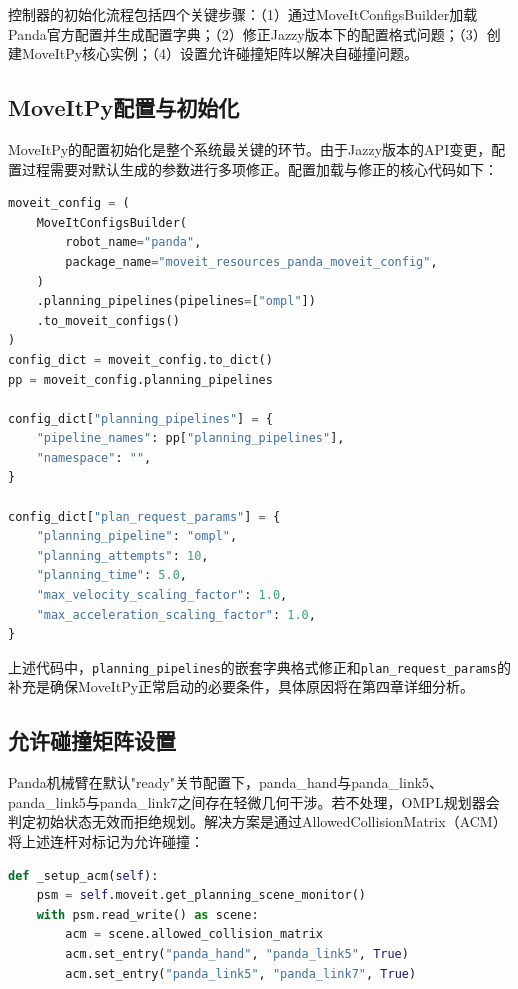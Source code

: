 \documentclass[a4paper,12pt]{ctexart}
\newcommand{\bodytext}{\fontsize{12pt}{20pt}\selectfont\setlength{\parskip}{0pt}}
\begin{document}
控制器的初始化流程包括四个关键步骤：（1）通过MoveItConfigsBuilder加载Panda官方配置并生成配置字典；（2）修正Jazzy版本下的配置格式问题；（3）创建MoveItPy核心实例；（4）设置允许碰撞矩阵以解决自碰撞问题。

\subsection{MoveItPy配置与初始化}

\bodytext

MoveItPy的配置初始化是整个系统最关键的环节。由于Jazzy版本的API变更，配置过程需要对默认生成的参数进行多项修正。配置加载与修正的核心代码如下：

\begin{lstlisting}[language=Python, caption={MoveItPy配置加载与修正}]
moveit_config = (
    MoveItConfigsBuilder(
        robot_name="panda",
        package_name="moveit_resources_panda_moveit_config",
    )
    .planning_pipelines(pipelines=["ompl"])
    .to_moveit_configs()
)
config_dict = moveit_config.to_dict()
pp = moveit_config.planning_pipelines

config_dict["planning_pipelines"] = {
    "pipeline_names": pp["planning_pipelines"],
    "namespace": "",
}

config_dict["plan_request_params"] = {
    "planning_pipeline": "ompl",
    "planning_attempts": 10,
    "planning_time": 5.0,
    "max_velocity_scaling_factor": 1.0,
    "max_acceleration_scaling_factor": 1.0,
}
\end{lstlisting}

上述代码中，\texttt{planning\_pipelines}的嵌套字典格式修正和\texttt{plan\_request\_params}的补充是确保MoveItPy正常启动的必要条件，具体原因将在第四章详细分析。

\subsection{允许碰撞矩阵设置}

\bodytext

Panda机械臂在默认"ready"关节配置下，panda\_hand与panda\_link5、panda\_link5与panda\_link7之间存在轻微几何干涉。若不处理，OMPL规划器会判定初始状态无效而拒绝规划。解决方案是通过AllowedCollisionMatrix（ACM）将上述连杆对标记为允许碰撞：

\begin{lstlisting}[language=Python, caption={允许碰撞矩阵设置}]
def _setup_acm(self):
    psm = self.moveit.get_planning_scene_monitor()
    with psm.read_write() as scene:
        acm = scene.allowed_collision_matrix
        acm.set_entry("panda_hand", "panda_link5", True)
        acm.set_entry("panda_link5", "panda_link7", True)
\end{lstlisting}
\end{document}

